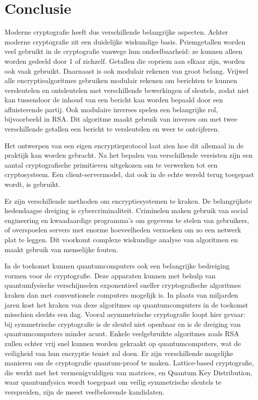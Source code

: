 \documentclass{report} %
\begin{document}
\chapter{Conclusie}
Moderne cryptografie heeft dus verschillende belangrijke aspecten. Achter moderne cryptografie zit een duidelijke wiskundige basis. Priemgetallen worden veel gebruikt in de cryptografie vanwege hun ondeelbaarheid: ze kunnen alleen worden gedeeld door 1 of zichzelf. Getallen die copriem aan elkaar zijn, worden ook vaak gebruikt. Daarnaast is ook modulair rekenen van groot belang. Vrijwel alle encryptiealgoritmes gebruiken modulair rekenen om berichten te kunnen versleutelen en ontsleutelen met verschillende bewerkingen of sleutels, zodat niet kan tussendoor de inhoud van een bericht kan worden bepaald door een afluisterende partij. Ook modulaire inverses spelen een belangrijke rol, bijvoorbeeld in RSA. Dit algoritme maakt gebruik van inverses om met twee verschillende getallen een bericht te versleutelen en weer te ontcijferen.
\par Het ontwerpen van een eigen encryptieprotocol laat zien hoe dit allemaal in de praktijk kan worden gebracht. Na het bepalen van verschillende vereisten zijn een aantal cryptografische primitieven uitgekozen om te verwerken tot een cryptosysteem. Een client-servermodel, dat ook in de echte wereld terug toegepast wordt, is gebruikt.
\par Er zijn verschillende methoden om encryptiesystemen te kraken. De belangrijkste hedendaagse dreiging is cybercriminaliteit. Criminelen maken gebruik van social engineering en kwaadaardige programma's om gegevens te stelen van gebruikers, of overspoelen servers met enorme hoeveelheden verzoeken om zo een netwerk plat te leggen. Dit voorkomt complexe wiskundige analyse van algoritmen en maakt gebruik van menselijke fouten.
\par In de toekomst kunnen quantumcomputers ook een belangrijke bedreiging vormen voor de cryptografie. Deze apparaten kunnen met behulp van quantumfysische verschijnselen exponentieel sneller cryptografische algoritmes kraken dan met conventionele computers mogelijk is. In plaats van miljarden jaren kost het kraken van deze algoritmes op quantumcomputers in de toekomst misschien slechts een dag. Vooral asymmetrische cryptografie loopt hier gevaar: bij symmetrische cryptografie is de sleutel niet openbaar en is de dreiging van quantumcomputers minder acuut. Enkele veelgebruikte algoritmes zoals RSA zullen echter vrij snel kunnen worden gekraakt op quantumcomputers, wat de veiligheid van hun encryptie teniet zal doen. Er zijn verschillende mogelijke manieren om de cryptografie quantum-proof te maken. Lattice-based cryptografie, die werkt met het vermenigvuldigen van matrices, en Quantum Key Distribution, waar quantumfysica wordt toegepast om veilig symmetrische sleutels te verspreiden, zijn de meest veelbelovende kandidaten.
\end{document}
